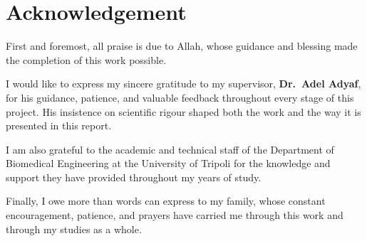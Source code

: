 \chapter*{Acknowledgement}

First and foremost, all praise is due to Allah, whose guidance and
blessing made the completion of this work possible.

I would like to express my sincere gratitude to my supervisor,
\textbf{Dr.\ Adel Adyaf}, for his guidance, patience, and valuable
feedback throughout every stage of this project. His insistence on
scientific rigour shaped both the work and the way it is presented in
this report.

I am also grateful to the academic and technical staff of the Department
of Biomedical Engineering at the University of Tripoli for the knowledge
and support they have provided throughout my years of study.

Finally, I owe more than words can express to my family, whose constant
encouragement, patience, and prayers have carried me through this work
and through my studies as a whole.
\thispagestyle{plain}
